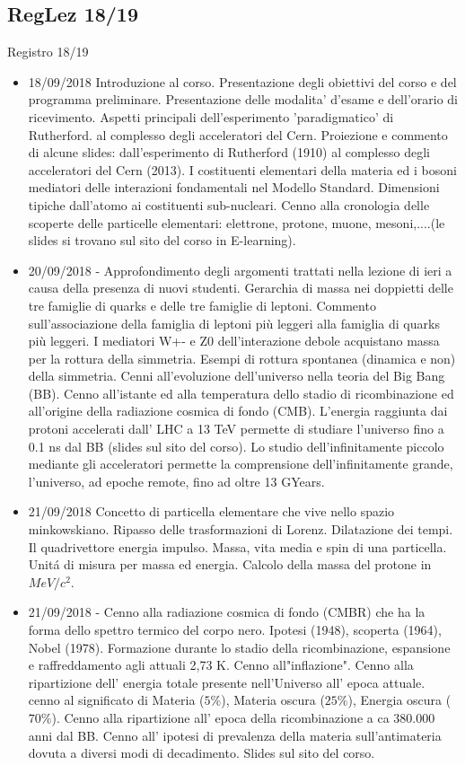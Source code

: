 \subsection{RegLez 18/19}
\begin{frame}{Registro 18/19}

\begin{itemize}
\item 18/09/2018 Introduzione al corso. Presentazione degli obiettivi del corso e del programma preliminare. Presentazione delle modalita' d'esame e dell'orario di ricevimento. Aspetti principali dell'esperimento 'paradigmatico' di Rutherford. al complesso degli acceleratori del Cern. Proiezione e commento di alcune slides: dall'esperimento di Rutherford (1910) al complesso degli acceleratori del Cern (2013). I costituenti elementari della materia ed i bosoni mediatori delle interazioni fondamentali nel Modello Standard. Dimensioni tipiche dall'atomo ai costituenti sub-nucleari. Cenno alla cronologia delle scoperte delle particelle elementari: elettrone, protone, muone, mesoni,....(le slides si trovano sul sito del corso in E-learning).
\item 20/09/2018 - Approfondimento degli argomenti trattati nella lezione di ieri a causa della presenza di nuovi studenti. Gerarchia di massa nei doppietti delle tre famiglie di quarks e delle tre famiglie di leptoni. Commento sull'associazione della famiglia di leptoni più leggeri alla famiglia di quarks più leggeri. I mediatori W+- e Z0 dell'interazione debole acquistano massa per la rottura della simmetria. Esempi di rottura spontanea (dinamica e non) della simmetria. Cenni all'evoluzione dell'universo nella teoria del Big Bang (BB). Cenno all'istante ed alla temperatura dello stadio di ricombinazione ed all'origine della radiazione cosmica di fondo (CMB). L'energia raggiunta dai protoni accelerati dall' LHC a 13 TeV permette di studiare l'universo fino a 0.1 ns dal BB (slides sul sito del corso). Lo studio dell'infinitamente piccolo mediante gli acceleratori permette la comprensione dell'infinitamente grande, l'universo, ad epoche remote, fino ad oltre 13 GYears.
\item 21/09/2018 Concetto di particella elementare che vive nello spazio minkowskiano. Ripasso delle trasformazioni di Lorenz. Dilatazione dei tempi. Il quadrivettore energia impulso. Massa, vita media e spin di una particella. Unit\'a di misura per massa ed energia. Calcolo della massa del protone in $MeV/c^2$.
\item 21/09/2018 - Cenno alla radiazione cosmica di fondo (CMBR) che ha la forma dello spettro termico del corpo nero. Ipotesi (1948), scoperta (1964), Nobel (1978). Formazione durante lo stadio della ricombinazione, espansione e raffreddamento agli attuali 2,73 K. Cenno all"inflazione". Cenno alla ripartizione dell' energia totale presente nell'Universo all' epoca attuale. cenno al significato di Materia ($5\%$), Materia oscura ($25\%$), Energia oscura ($70\%$). Cenno alla ripartizione all' epoca della ricombinazione a ca 380.000 anni dal BB. Cenno all' ipotesi di prevalenza della materia sull'antimateria dovuta a diversi modi di decadimento. Slides sul sito del corso.

\end{itemize}
\end{frame}
